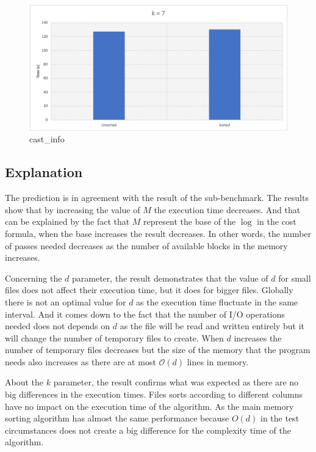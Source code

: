 \documentclass[12pt]{article}
\begin{document}
\begin{figure}[H] 
 \begin{center}
\includegraphics[scale=0.7]{images/sorted-unsorted.png}
\end{center}
\caption{cast\_info}
\label{fig:10}
\end{figure}
\subsection{Explanation}

The prediction is in agreement with the result of the sub-benchmark. The results show that by increasing the value of $M$ the execution time decreases. And that can be explained by the fact that $M$ represent the base of the $\log$ in the cost formula, when the base increases the result decreases. In other words, the number of passes needed decreases as the number of available blocks in the memory increases.

Concerning the $d$ parameter, the result demonstrates that the value of $d$ for small files does not affect their execution time, but it does for bigger files. Globally there is not an optimal value for $d$ as the execution time fluctuate in the same interval. And it comes down to the fact that the number of I/O operations needed does not depends on $d$ as the file will be read and written entirely but it will change the number of temporary files to create. When $d$ increases the number of temporary files decreases but the size of the memory that the program needs also increases as there are at most $\mathcal{O}(d)$ lines in memory.

About the $k$ parameter, the result confirms what was expected as there are no big differences in the execution times. Files sorts according to different columns have no impact on the execution time of the algorithm. As the main memory sorting algorithm has almost the same performance because $O(d)$ in the test circumstances does not create a big difference for the complexity time of the algorithm.
\end{document}
